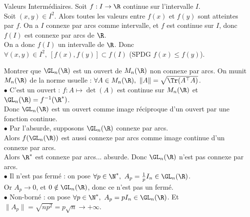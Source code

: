 \documentclass[11pt]{article}
\begin{document}
\begin{thm}{Valeurs Intermédiaires.}{}
    Soit $f:I\to\R$ continue sur l'intervalle $I$.\\
    Soit $(x,y)\in I^2$. Alors toutes les valeurs entre $f(x)$ et $f(y)$ sont atteintes par $f$.
    \tcblower
    On a $I$ connexe par arcs comme intervalle, et $f$ est continue sur $I$, donc $f(I)$ est connexe par arcs de $\R$.\\
    On a donc $f(I)$ un intervalle de $\R$. Donc $\forall (x,y) \in I^2, ~ [f(x),f(y)]\subset f(I)$ (SPDG $f(x)\leq f(y)$).
\end{thm}

\begin{ex}{}{}
    Montrer que $\GL_n(\R)$ est un ouvert de $M_n(\R)$ non connexe par arcs.
    \tcblower
    On munit $M_n(\R)$ de la norme usuelle : $\forall A \in M_n(\R), ~ \|A\|=\sqrt{\Tr(A^\top A)}$.\\
    $\bullet$ C'est un ouvert : $f:A\mapsto \det(A)$ est continue sur $M_n(\R)$ et $\GL_n(\R)=f^{-1}(\R^*)$.\\
    Donc $\GL_n(\R)$ est un ouvert comme image réciproque d'un ouvert par une fonction continue.\\
    $\bullet$ Par l'absurde, supposons $\GL_n(\R)$ connexe par arcs.\\
    Alors $f(\GL_n(\R))$ est aussi connexe par arcs comme image continue d'un connexe par arcs.\\
    Alors $\R^*$ est connexe par arcs... absurde. Donc $\GL_n(\R)$ n'est pas connexe par arcs.\\
    $\bullet$ Il n'est pas fermé : on pose $\forall p \in \N^*, ~ A_p=\frac{1}{p}I_n\in\GL_n(\R)$.\\
    Or $A_p \to 0$, et $0\notin\GL_n(\R)$, donc ce n'est pas un fermé.\\
    $\bullet$ Non-borné : on pose $\forall p \in \N^*, ~ A_p=pI_n\in\GL_n(\R)$. Et $\|A_p\|=\sqrt{np^2}=p\sqrt{n}\to+\infty$. 
\end{ex}

\pagebreak
\end{document}
